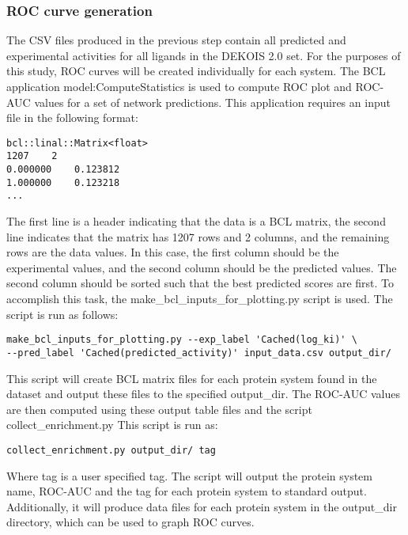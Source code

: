 \subsubsection{\ac{ROC} curve generation}
The \ac{CSV} files produced in the previous step contain all predicted and experimental activities for all ligands in the DEKOIS 2.0 set.
For the purposes of this study, \ac{ROC} curves will be created individually for each system. 
The \ac{BCL} application model:ComputeStatistics is used to compute \ac{ROC} plot and \ac{ROC-AUC} values for a set of network predictions.
This application requires an input file in the following format:
\singlespace
\begin{verbatim}
bcl::linal::Matrix<float>
1207	2
0.000000	0.123812
1.000000	0.123218
...
\end{verbatim}
\doublespace
The first line is a header indicating that the data is a \ac{BCL} matrix, the second line indicates that the matrix has 1207 rows and 2 columns, and the remaining rows are the data values.
In this case, the first column should be the experimental values, and the second column should be the predicted values.
The second column should be sorted such that the best predicted scores are first.
To accomplish this task, the make\_bcl\_inputs\_for\_plotting.py script is used. 
The script is run as follows:
\singlespace
\begin{verbatim}
make_bcl_inputs_for_plotting.py --exp_label 'Cached(log_ki)' \
--pred_label 'Cached(predicted_activity)' input_data.csv output_dir/
\end{verbatim}
\doublespace
This script will create \ac{BCL} matrix files for each protein system found in the dataset and output these files to the specified output\_dir.
The \ac{ROC-AUC} values are then computed using these output table files and the script collect\_enrichment.py
This script is run as:
\singlespace
\begin{verbatim}
collect_enrichment.py output_dir/ tag
\end{verbatim}
\doublespace
Where tag is a user specified tag.
The script will output the protein system name, \ac{ROC-AUC} and the tag for each protein system to standard output.
Additionally, it will produce data files for each protein system in the output\_dir directory, which can be used to graph \ac{ROC} curves. 
